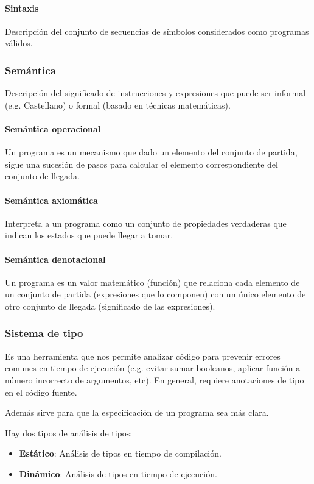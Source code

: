 \paragraph{Sintaxis} Descripción del conjunto de secuencias de símbolos considerados como programas válidos.

\subsubsection{Semántica}

Descripción del significado de instrucciones y expresiones que puede ser informal (e.g. Castellano) o formal (basado en técnicas matemáticas).

\paragraph{Semántica operacional} Un programa es un mecanismo que dado un elemento del conjunto de partida, sigue una sucesión de pasos para calcular el elemento correspondiente del conjunto de llegada.

\paragraph{Semántica axiomática} Interpreta a un programa como un conjunto de propiedades verdaderas que indican los estados que puede llegar a tomar.

\paragraph{Semántica denotacional} Un programa es un valor matemático (función) que relaciona cada elemento de un conjunto de partida (expresiones que lo componen) con un único elemento de otro conjunto de llegada (significado de las expresiones).

\subsubsection{Sistema de tipo}
Es una herramienta que nos permite analizar código para prevenir errores comunes en tiempo de ejecución (e.g. evitar sumar booleanos, aplicar función a número incorrecto de argumentos, etc). En general, requiere anotaciones de tipo en el código fuente. 

Además sirve para que la especificación de un programa sea más clara.

Hay dos tipos de análisis de tipos:
\begin{itemize}
	\item \textbf{Estático}: Análisis de tipos en tiempo de compilación.
	\item \textbf{Dinámico}: Análisis de tipos en tiempo de ejecución.
\end{itemize}

